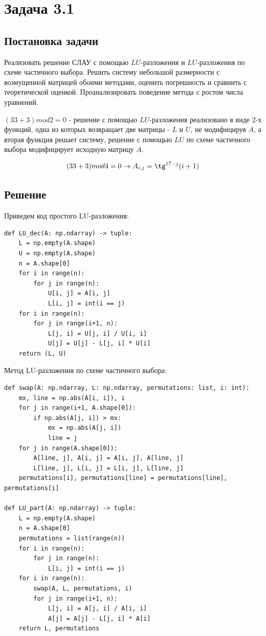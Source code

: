 \documentclass[a4paper,12pt]{report} %
\begin{document}
\section*{Задача 3.1}
\subsection*{Постановка задачи}

Реализовать решение СЛАУ с помощью $LU$-разложения и $LU$-разложения по схеме частичного выбора.
Решить систему небольшой размерности с возмущенной матрицей обоими методами, оценить погрешность и сравнить с теоретической оценкой. Проанализировать поведение метода с ростом числа уравнений.

$(33 + 3) mod 2 = 0$ - решение с помощью $LU$-разложения  реализовано в виде 2-х функций, одна из которых возвращает две матрицы - $L$ и $U$, не модифицируя $A$, а вторая функция решает систему, решение с помощью $LU$ по схеме частичного выбора модифицирует исходную матрицу $A$.

\[
	(33+3) mod 4 = 0 \to A_{i, j} = \tg^{17-j}(i + 1)
\]
\subsection*{Решение}
Приведем код простого LU-разложения:

\begin{lstlisting}
def LU_dec(A: np.ndarray) -> tuple:
    L = np.empty(A.shape)
    U = np.empty(A.shape)
    n = A.shape[0]
    for i in range(n):
        for j in range(n):
            U[i, j] = A[i, j]
            L[i, j] = int(i == j)
    for i in range(n):
        for j in range(i+1, n):
            L[j, i] = U[j, i] / U[i, i]
            U[j] = U[j] - L[j, i] * U[i]
    return (L, U)
\end{lstlisting}
\newpage
Метод LU-разложения по схеме частичного выбора:

\begin{lstlisting}
def swap(A: np.ndarray, L: np.ndarray, permutations: list, i: int):
    mx, line = np.abs(A[i, i]), i
    for j in range(i+1, A.shape[0]):
        if np.abs(A[j, i]) > mx:
            mx = np.abs(A[j, i])
            line = j
    for j in range(A.shape[0]):
        A[line, j], A[i, j] = A[i, j], A[line, j]
        L[line, j], L[i, j] = L[i, j], L[line, j]
    permutations[i], permutations[line] = permutations[line], permutations[i]

def LU_part(A: np.ndarray) -> tuple:
    L = np.empty(A.shape)
    n = A.shape[0]
    permutations = list(range(n))
    for i in range(n):
        for j in range(n):
            L[i, j] = int(i == j)
    for i in range(n):
        swap(A, L, permutations, i)
        for j in range(i+1, n):
            L[j, i] = A[j, i] / A[i, i]
            A[j] = A[j] - L[j, i] * A[i]
    return L, permutations
\end{lstlisting}
\end{document}
